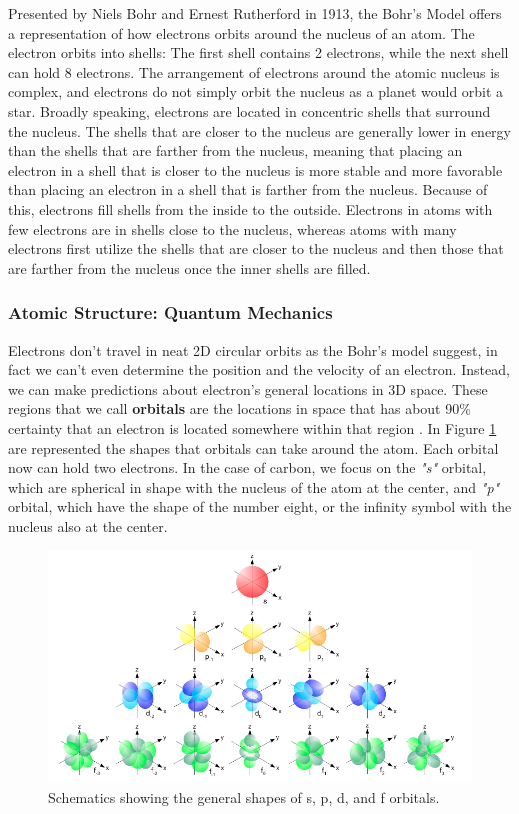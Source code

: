 Presented by Niels Bohr and Ernest Rutherford in 1913, the Bohr's Model offers a representation of how electrons orbits around the nucleus of an atom. The electron orbits into shells:  The first shell contains 2 electrons, while the next shell can hold 8 electrons. The arrangement of electrons around the atomic nucleus is complex, and electrons do not simply orbit the nucleus as a planet would orbit a star. Broadly speaking, electrons are located in concentric shells that surround the nucleus. The shells that are closer to the nucleus are generally lower in energy than the shells that are farther from the nucleus, meaning that placing an electron in a shell that is closer to the nucleus is more stable and more favorable than placing an electron in a shell that is farther from the nucleus. Because of this, electrons fill shells from the inside to the outside. Electrons in atoms with few electrons are in shells close to the nucleus, whereas atoms with many electrons first utilize the shells that are closer to the nucleus and then those that are farther from the nucleus once the inner shells are filled. 

\subsubsection{Atomic Structure: Quantum Mechanics}

Electrons don't travel in neat 2D circular orbits as the Bohr's model suggest, in fact we can't even determine the position and the velocity of an electron. Instead, we can make predictions about electron's general locations in 3D space. These regions that we call \textbf{orbitals} are the locations in space that has about 90\% certainty that an electron is located somewhere within that region \cite{brown2016introduction}. In Figure \ref{fig:orbitals} are represented the shapes that orbitals can take around the atom. Each orbital now can hold two electrons. In the case of carbon, we focus on the \textit{"s"} orbital, which are spherical in shape with the nucleus of the atom at the center, and \textit{"p"} orbital, which have the shape of the number eight, or the infinity symbol with the nucleus also at the center. 

\begin{figure}[h]
    \centering
    \includegraphics[scale=0.5]{Figures/Chapter1/orbitals.png}
    \caption{Schematics showing the general shapes of s, p, d, and f orbitals.}
    \label{fig:orbitals}
\end{figure}

